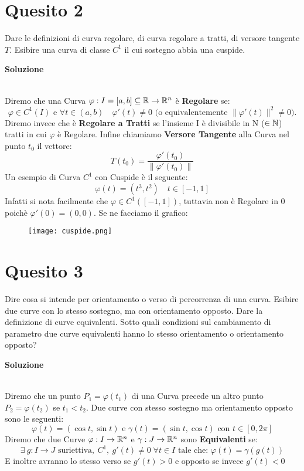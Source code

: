 \section*{Quesito 2}
Dare le definizioni di curva regolare, di curva regolare a tratti, di versore
tangente $T$. Esibire una curva di classe $C^1$
il cui sostegno abbia una cuspide.


\medskip
\begin{large}
\textbf{Soluzione}
\end{large}\\
Diremo che una Curva $\varphi : I = [a,b]\subseteq \mathbb{R}\to\mathbb{R}^n$ è \textbf{Regolare}
se:
\[
  \varphi\in C^1(I) \text{ e } \forall t \in (a,b) \quad \varphi'(t)\neq 0
\text{ (o equivalentemente } \|\varphi'(t)\|^2\neq0).
\]
Diremo invece che è \textbf{Regolare a Tratti}
se l'insieme I è divisibile in N ($\in\mathbb{N}$) tratti
in cui $\varphi$ è Regolare. Infine chiamiamo \textbf{Versore Tangente}
alla Curva nel punto $t_0$ il vettore:
\[
T(t_0)=\frac{\varphi'(t_0)}{\|\varphi'(t_0)\|}  
\]
Un esempio di Curva $C^1$ con Cuspide è il seguente:
\[
\varphi(t)=(t^3,t^2)\quad t\in[-1,1]
\]
Infatti si nota facilmente che $\varphi\in C^1([-1,1])$,
tuttavia non è Regolare in $0$ poichè $\varphi'(0)=(0,0)$. Se ne facciamo il grafico:
\begin{figure}[h]
  \texttt{[image: cuspide.png]}
\end{figure}


\section*{Quesito 3}
Dire cosa si intende per orientamento o verso di percorrenza di una curva.
Esibire due curve con lo stesso sostegno, ma con orientamento opposto. Dare la definizione
di curve equivalenti. Sotto quali condizioni sul cambiamento di parametro due curve
equivalenti hanno lo stesso orientamento o orientamento opposto?


\medskip
\begin{large}
\textbf{Soluzione}
\end{large}\\
Diremo che un punto $P_1=\varphi(t_1)$ di una Curva precede un altro punto $P_2=\varphi(t_2)$ se $t_1<t_2$.
Due curve con stesso sostegno ma orientamento opposto sono le seguenti:
\[
\varphi(t)=(\cos t, \sin t) \text{ e } \gamma(t)=(\sin t, \cos t) \text{ con } t\in [0,2\pi]  
\]
Diremo che due Curve $\varphi:I\to\mathbb{R}^n$ e $\gamma:J\to\mathbb{R}^n$ sono \textbf{Equivalenti} se:
\[
\exists \: g:I\to J \text{ suriettiva},\:C^1,\:g'(t)\neq0\;\forall t\in I \text{ tale che: } \varphi(t)=\gamma(g(t))
\]
E inoltre avranno lo stesso verso se $g'(t)>0$ e opposto se invece $g'(t)<0$
